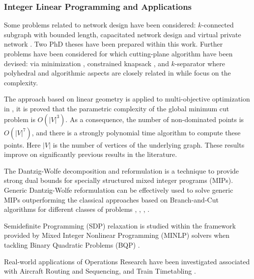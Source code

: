 \subsubsection{Integer Linear Programming and Applications}

 Some problems related to network design have been considered: $k$-connected subgraph with bounded length, capacitated network design and virtual private network \cite{Uchoa2013Hop-level-624237, Lacroix2012Models-610920}. Two PhD theses have been prepared within this work. Further problems have been considered for which cutting-plane algorithm have been devised: via minimization \cite{DBLP:conf/iscopt/LacroixMM12}, constrained knapsack \cite{DBLP:conf/codit/SalemTAM16}, and $k$-separator where polyhedral and algorithmic aspects are closely related in
 \cite{DBLP:conf/drcn/DiarrassoubaMM16,DBLP:conf/codit/MagnoucheMM16, Mahjoub2012Polyhedral-619459} while \cite{Mahjoub2012On-624880, Lacroix2012On-615125} focus on the complexity.

The approach based on linear geometry is applied to multi-objective optimization  in \cite{Aissi2014A-775489,DBLP:journals/mp/AissiMMQ15}, it is proved that the parametric complexity of the global minimum cut problem is $O(|V|^3)$. 
 As a consequence,  the number of non-dominated points is $O(|V|^7)$, and there is a strongly polynomial time algorithm to compute these points. Here $|V|$ is the number of vertices of the underlying graph. These results improve on significantly previous results in the literature.  



The Dantzig-Wolfe decomposition and reformulation is a technique  to provide strong dual bounds for specially structured mixed integer programs (MIPs). 
Generic Dantzig-Wolfe reformulation can be effectively used to solve generic MIPs outperforming the classical approaches based on Branch-and-Cut algorithms for different classes of problems \cite{DBLP:journals/mp/BergnerCCFLMT15}, \cite{DBLP:journals/informs/CapraraFM13}, \cite{DBLP:journals/ipl/CapraraFMT16}, \cite{DBLP:journals/cor/FuriniM13}. 

 Semidefinite Programming (SDP) relaxation is studied within the framework provided by Mixed Integer Nonlinear Programming (MINLP) solvers when tackling Binary Quadratic Problems (BQP) \cite{Furini2013Hybrid-1307565}. 
 
Real-world applications of Operations Research have been investigated associated with Aircraft Routing and Sequencing,  and Train Timetabling \cite{Cacchiani201697}. 

